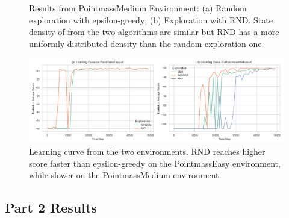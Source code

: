 \documentclass[10pt, letterpaper]{article}
\begin{document}
\begin{figure}[h!]
    \centering
    \caption{Results from PointmassMedium Environment: (a) Random exploration with epsilon-greedy; (b) Exploration with RND. State density of from the two algorithms are similar but RND has a more uniformly distributed density than the random exploration one.}
    \label{fig:2}
\end{figure}

\begin{figure}[h!]
    \centering
    \includegraphics[width=\textwidth]{q1_learning_curve.png}
    \caption{Learning curve from the two environments. RND reaches higher score faster than epsilon-greedy on the PointmassEasy environment, while slower on the PointmassMedium environment.}
    \label{fig:3}
\end{figure}

\subsection*{Part 2 Results}
\end{document}
